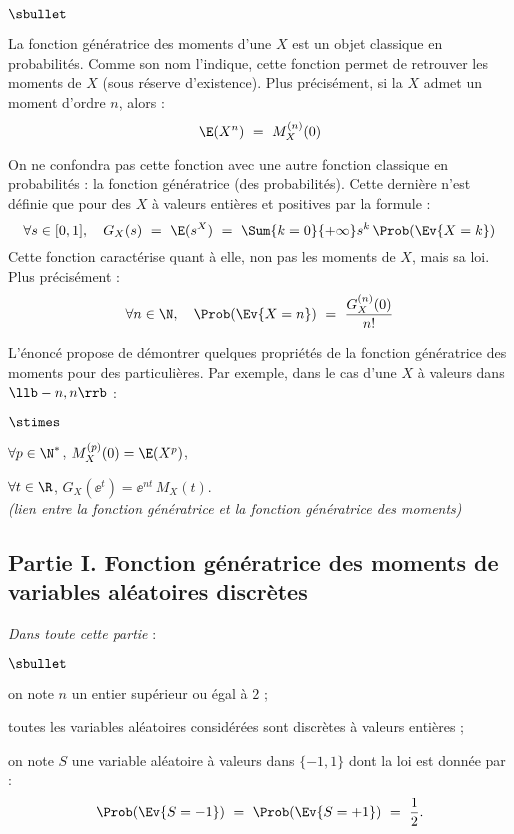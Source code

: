 \documentclass[11pt]{article}%
\begin{document}
\begin{remark}
  \begin{noliste}{$\sbullet$}
  \item La fonction génératrice des moments d'une \var $X$ est un
    objet classique en probabilités. Comme son nom l'indique, cette
    fonction permet de retrouver les moments de $X$ (sous réserve
    d'existence). Plus précisément, si la \var $X$ admet un moment
    d'ordre $n$, alors :
    \[
      \E(X^n) \ = \ M_X^{(n)}(0)
    \]
    
  \item On ne confondra pas cette fonction avec une autre fonction
    classique en probabilités : la fonction génératrice (des
    probabilités). Cette dernière n'est définie que pour des \var $X$
    à valeurs entières et positives par la formule :
    \[
      \forall s \in [0,1], \quad G_X(s) \ = \ \E(s^X) \ = \
      \Sum{k=0}{+\infty} s^k \, \Prob(\Ev{X = k})
    \]
    Cette fonction caractérise quant à elle, non pas les moments de
    $X$, mais sa loi.\\
    Plus précisément :
    \[
      \forall n \in \N, \quad \Prob(\Ev{X = n}) \ = \
      \dfrac{G_X^{(n)}(0)}{n!}
    \]
    
  \item L'énoncé propose de démontrer quelques propriétés de la
    fonction génératrice des moments pour des \var particulières. Par
    exemple, dans le cas d'une \var $X$ à valeurs dans $\llb -n, n \rrb$ :
    \begin{noliste}{$\stimes$}
    \item $\forall p \in \N^*$, $M_X^{(p)}(0) = \E(X^p)$,
      
    \item $\forall t \in \R$, $G_X(\ee^t) = \ee^{nt} \, M_X(t)$.\\
      {\it (lien entre la fonction génératrice et la fonction génératrice
      des moments)}
    \end{noliste}
  \end{noliste}
\end{remark}


\newpage


\subsection*{Partie I. Fonction génératrice des moments de variables
  aléatoires discrètes}

\noindent
{\it Dans toute cette partie} :
\begin{noliste}{$\sbullet$}
\item on note $n$ un entier supérieur ou égal à $2$ ;
  
\item toutes les variables aléatoires considérées sont discrètes à
  valeurs entières ;
  
\item on note $S$ une variable aléatoire à valeurs dans $\{-1,1\}$
  dont la loi est donnée par :
  \[
    \Prob(\Ev{S = -1}) \ = \ \Prob(\Ev{S = +1}) \ = \ \dfrac{1}{2}.
  \]
\end{noliste}
\end{document}
